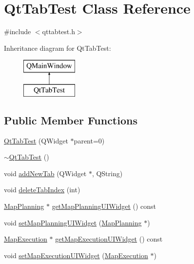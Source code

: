 \hypertarget{class_qt_tab_test}{}\section{Qt\+Tab\+Test Class Reference}
\label{class_qt_tab_test}


{\ttfamily \#include $<$qttabtest.\+h$>$}

Inheritance diagram for Qt\+Tab\+Test\+:\begin{figure}[H]
\begin{center}
\leavevmode
\includegraphics[height=2.000000cm]{class_qt_tab_test}
\end{center}
\end{figure}
\subsection*{Public Member Functions}
\begin{DoxyCompactItemize}
\item 
\hyperlink{class_qt_tab_test_af938cba3872db479e49de0c2f4a2d353}{Qt\+Tab\+Test} (Q\+Widget $\ast$parent=0)
\item 
\hyperlink{class_qt_tab_test_ab3c73076dfe26ba129dbc9421154b572}{$\sim$\+Qt\+Tab\+Test} ()
\item 
void \hyperlink{class_qt_tab_test_a71445077b93df68b1fef88ed8133d4c9}{add\+New\+Tab} (Q\+Widget $\ast$, Q\+String)
\item 
void \hyperlink{class_qt_tab_test_a1218449139a279a20325ee6ff790573c}{delete\+Tab\+Index} (int)
\item 
\hyperlink{class_map_planning}{Map\+Planning} $\ast$ \hyperlink{class_qt_tab_test_ad7f602d0285a16d25da6cf0b4b04a9e2}{get\+Map\+Planning\+U\+I\+Widget} () const 
\item 
void \hyperlink{class_qt_tab_test_ac1c2917b9b1db269974664ba64868c83}{set\+Map\+Planning\+U\+I\+Widget} (\hyperlink{class_map_planning}{Map\+Planning} $\ast$)
\item 
\hyperlink{class_map_execution}{Map\+Execution} $\ast$ \hyperlink{class_qt_tab_test_a288a55c8ffe6dc4d049954d7b07bd662}{get\+Map\+Execution\+U\+I\+Widget} () const 
\item 
void \hyperlink{class_qt_tab_test_abf3b471245a1b63675f2c94668456eb4}{set\+Map\+Execution\+U\+I\+Widget} (\hyperlink{class_map_execution}{Map\+Execution} $\ast$)
\end{DoxyCompactItemize}
